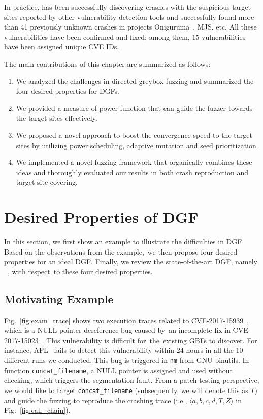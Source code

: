 In practice, \dFOT has been successfully discovering crashes with the suspicious target sites reported by other vulnerability detection tools and successfully found more than 41 previously unknown crashes in projects Oniguruma~\cite{oniguruma}, MJS\cite{mjs}, etc. All these vulnerabilities have been confirmed and fixed; among them, 15 vulnerabilities have been assigned unique CVE IDs.

The main contributions of this chapter are summarized as follows:
\begin{enumerate}[(1)] 
\itemsep0em
\item We analyzed the challenges in directed greybox fuzzing and summarized the four desired properties for DGFs.
\item We provided a measure of power function that can guide the fuzzer towards the target sites effectively.
\item We proposed a novel approach to boost the convergence speed to the target sites by utilizing power scheduling, adaptive mutation and seed prioritization.
\item We implemented a novel fuzzing framework that organically combines these ideas and thoroughly evaluated our results in both crash reproduction and target site covering.
\end{enumerate} 

\section{Desired Properties of DGF}\label{sec:mx}

In this section, we first show an example to illustrate the difficulties in DGF.
Based on the observations from the example,~we then propose four desired properties for an ideal DGF.
Finally, we review the state-of-the-art DGF, namely \aflgo~\cite{Bohme:2017:DGF}, with respect~to these four desired properties. 


\subsection{Motivating Example}\label{subsec:motiv}



Fig.~\ref{fig:exam_trace} shows two execution traces related to CVE-2017-15939~\cite{cve-2017-15939}, which is a NULL pointer dereference bug caused by~an incomplete fix in CVE-2017-15023~\cite{cve-2017-15023}.
This vulnerability is difficult for~the~existing GBFs to discover.
For instance, AFL~\cite{afl} fails to detect this vulnerability within 24 hours in all the 10 different runs we conducted.
This bug is triggered in \texttt{nm} from GNU binutils.
In function \texttt{concat\_filename}, a NULL pointer is assigned and used without checking, which triggers the segmentation fault.
From a patch testing perspective, we would like to target \texttt{concat\_filename} (subsequently, we will denote this as $T$) and guide the fuzzing to reproduce the crashing trace (i.e., $\langle a, b, c, d, T, Z\rangle$ in Fig.~\ref{fig:call_chain}).




